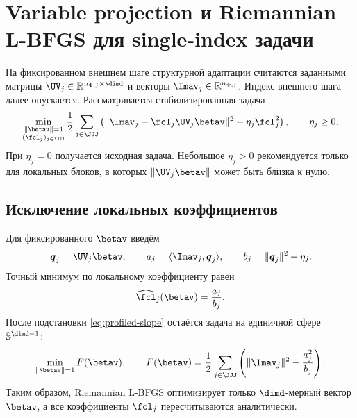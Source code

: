 
\section{Variable projection и Riemannian L-BFGS для single-index задачи}
\label{sec:varpro-rlbfgs}

На фиксированном внешнем шаге структурной адаптации считаются заданными
матрицы $\UV_j\in\mathbb R^{n_{\Phi,j}\times\dimd}$ и векторы
$\Imav_j\in\mathbb R^{n_{\Phi,j}}$. Индекс внешнего шага далее опускается.
Рассматривается стабилизированная задача
\begin{equation}
\min_{\substack{\|\betav\|=1\\(\fcl_j)_{j\in\JJJ}}}
\frac12\sum_{j\in\JJJ}
\left(
 \|\Imav_j-\fcl_j\UV_j\betav\|^2
 +\eta_j\fcl_j^2
\right),
\qquad \eta_j\ge 0.
\label{eq:rlbfgs-original}
\end{equation}
При $\eta_j=0$ получается исходная задача. Небольшое $\eta_j>0$ рекомендуется только для локальных блоков, в которых $\|\UV_j\betav\|$ может быть близка к нулю.

\subsection{Исключение локальных коэффициентов}

Для фиксированного $\betav$ введём
\begin{equation}
 \boldsymbol{q}_j=\UV_j\betav,
 \qquad
 a_j=\langle\Imav_j,\boldsymbol{q}_j\rangle,
 \qquad
 b_j=\|\boldsymbol{q}_j\|^2+\eta_j.
\end{equation}
Точный минимум по локальному коэффициенту равен
\begin{equation}
 \widehat{\fcl}_j(\betav)=\frac{a_j}{b_j}.
\label{eq:profiled-slope}
\end{equation}
После подстановки \eqref{eq:profiled-slope} остаётся задача на единичной сфере
$\mathbb S^{\dimd-1}$:
\begin{equation}
 \min_{\|\betav\|=1}F(\betav),
 \qquad
 F(\betav)=
 \frac12\sum_{j\in\JJJ}
 \left(
  \|\Imav_j\|^2-\frac{a_j^2}{b_j}
 \right).
\label{eq:profiled-objective}
\end{equation}
Таким образом, Riemannian L-BFGS оптимизирует только $\dimd$-мерный вектор
$\betav$, а все коэффициенты $\fcl_j$ пересчитываются аналитически.


